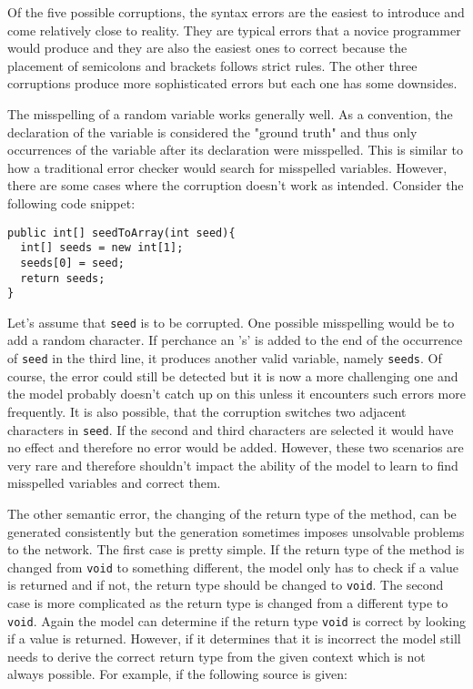 Of the five possible corruptions, the syntax errors are the easiest to introduce and come relatively close to reality. They are typical errors that a novice programmer would produce and they are also the easiest ones to correct because the placement of semicolons and brackets follows strict rules. The other three corruptions produce more sophisticated errors but each one has some downsides.

The misspelling of a random variable works generally well. As a convention, the declaration of the variable is considered the "ground truth" and thus only occurrences of the variable after its declaration were misspelled. This is similar to how a traditional error checker would search for misspelled variables. However, there are some cases where the corruption doesn't work as intended. Consider the following code snippet:

\begin{lstlisting}[style=inline]
public int[] seedToArray(int seed){
  int[] seeds = new int[1];
  seeds[0] = seed;
  return seeds;
}
\end{lstlisting}

Let's assume that \texttt{seed} is to be corrupted. One possible misspelling would be to add a random character. If perchance an 's' is added to the end of the occurrence of \texttt{seed} in the third line, it produces another valid variable, namely \texttt{seeds}. Of course, the error could still be detected but it is now a more challenging one and the model probably doesn't catch up on this unless it encounters such errors more frequently. It is also possible, that the corruption switches two adjacent characters in \texttt{seed}. If the second and third characters are selected it would have no effect and therefore no error would be added. However, these two scenarios are very rare and therefore shouldn't impact the ability of the model to learn to find misspelled variables and correct them.

The other semantic error, the changing of the return type of the method, can be generated consistently but the generation sometimes imposes unsolvable problems to the network. The first case is pretty simple. If the return type of the method is changed from \texttt{void} to something different, the model only has to check if a value is returned and if not, the return type should be changed to \texttt{void}. The second case is more complicated as the return type is changed from a different type to \texttt{void}. Again the model can determine if the return type \texttt{void} is correct by looking if a value is returned. However, if it determines that it is incorrect the model still needs to derive the correct return type from the given context which is not always possible. For example, if the following source is given:

